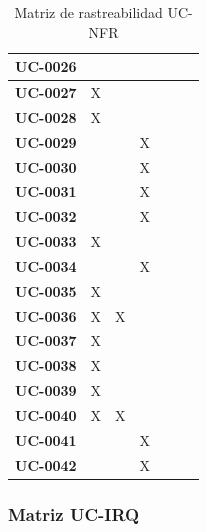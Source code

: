 \begin{table}[H]
\begin{tabular}{|p{2.2cm}|p{2.0cm}|p{2.0cm}|p{2.0cm}|p{2.0cm}|p{2.0cm}|p{2.0cm}|}
\hline
\textbf{UC-0026} & & & & & & \\
\hline
\textbf{UC-0027} & X & & & & & \\
\hline
\textbf{UC-0028} & X & & & & & \\
\hline
\textbf{UC-0029} & & & X & & & \\
\hline
\textbf{UC-0030} & & & X & & & \\
\hline
\textbf{UC-0031} & & & X & & & \\
\hline
\textbf{UC-0032} & & & X & & & \\
\hline
\textbf{UC-0033} & X & & & & & \\
\hline
\textbf{UC-0034} & & & X & & & \\
\hline
\textbf{UC-0035} & X & & & & & \\
\hline
\textbf{UC-0036} & X & X & & & & \\
\hline
\textbf{UC-0037} & X & & & & & \\
\hline
\textbf{UC-0038} & X & & & & & \\
\hline
\textbf{UC-0039} & X & & & & & \\
\hline
\textbf{UC-0040} & X & X & & & & \\
\hline
\textbf{UC-0041} & & & X & & & \\
\hline
\textbf{UC-0042} & & & X & & & \\
\hline
\end{tabular}
\caption{Matriz de rastreabilidad UC-NFR}
\label{tab:matriz-uc-nfr}
\end{table}

\subsubsection{Matriz UC-IRQ}


